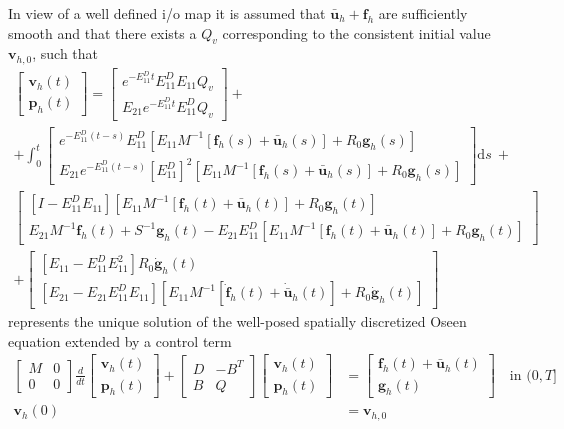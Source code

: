 \documentclass[a4paper,10pt,BCOR=15mm]{scrbook}
\providecommand{\inva}[1]{\text{d} #1}
\begin{document}
In view of a well defined i/o map it is assumed that $\bar {\mathbf u}_h + \mathbf f_h$ are sufficiently smooth and that there exists a $Q_v$ corresponding to the consistent initial value $\mathbf v_{h,0}$, such that 
\begin{multline}\label{exsolos}
 \begin{bmatrix} \mathbf v_h(t) \\ \mathbf p_h(t) \end{bmatrix} = \begin{bmatrix} e^{-E_{11}^Dt} E_{11}^DE_{11}Q_v \\ E_{21}e^{-E_{11}^Dt}  E_{11}^DQ_v \end{bmatrix} + \\
+\int_0^t \begin{bmatrix} e^{-E_{11}^D(t-s)}  E_{11}^D [E_{11}M^{-1}[\mathbf f_h(s)  + \bar {\mathbf u}_h(s)]  + R_0 \mathbf g_h(s) ]\\ E_{21}e^{-E_{11}^D(t-s)}  [E_{11}^D]^2 [E_{11}M^{-1}[\mathbf f_h(s)  + \bar {\mathbf u}_h(s) ] + R_0 \mathbf g_h(s) ] \end{bmatrix} \inva{s} ~ +\\
 \begin{bmatrix} [I-E_{11}^D E_{11}] [E_{11}M^{-1}[\mathbf f_h (t)+ \bar {\mathbf u}_h(t)] + R_0 \mathbf g_h(t) ]\\  E_{21}M^{-1}\mathbf f_h(t)+S^{-1}\mathbf g_h(t)-E_{21}E_{11}^D [E_{11}M^{-1}[\mathbf f_h(t) + \bar {\mathbf u}_h(t)] + R_0 \mathbf g_h(t) ]  \end{bmatrix} \\ 
+\begin{bmatrix}[E_{11}-E_{11}^D E_{11}^2]  R_0\dot{ \mathbf g}_h(t)  \\ [E_{21}-E_{21}E_{11}^D E_{11}]  [E_{11}M^{-1}[\dot{\mathbf f}_h(t) + \dot{\bar {\mathbf u}}_h(t)] + R_0 \dot{\mathbf g}_h(t) ]\end{bmatrix}
\end{multline}
represents the unique solution of the well-posed spatially discretized Oseen equation extended by a control term
\begin{align}\label{seosco}
	\begin{bmatrix} M& 0 \\ 0& 0 \end{bmatrix} \frac{d}{dt} {\begin{bmatrix} \mathbf v_h(t) \\ \mathbf p_h(t)  \end{bmatrix}} + \begin{bmatrix} D& -B^T \\  B& Q \end{bmatrix} \begin{bmatrix} \mathbf v_h(t) \\ \mathbf p_h(t)  \end{bmatrix}&= \begin{bmatrix} \mathbf f_h(t) + \bar {\mathbf u}_h(t)\\ \mathbf g_h(t) \end{bmatrix} \quad \text{in  } (0,T] \\
\mathbf v_h(0) &= \mathbf v_{h,0}
\end{align}
\end{document}
